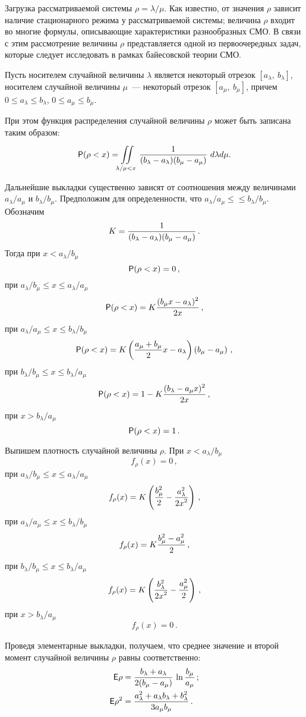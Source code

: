 \begin{multicols}{2}
Загрузка рассматриваемой системы $\rho=\lambda/\mu$. Как известно, от значения $\rho$ зависит наличие стационарного
режима у рассматриваемой системы; величина $\rho$ входит во многие формулы, опи\-сы\-ва\-ющие характеристики разнообразных
СМО. В связи с этим рассмотрение величины $\rho$ представляется одной из первоочередных задач, которые следует
исследовать в рамках байесовской теории СМО.

Пусть носителем случайной величины $\lambda$ является некоторый отрезок $[a_\lambda,\ b_\lambda]$, носителем случайной
величины $\mu$~--- некоторый отрезок $[a_\mu,\ b_\mu]$, причем $0\le a_\lambda\le b_\lambda$, $0\le a_\mu\le b_\mu$.

При этом функция распределения случайной величины $\rho$ может быть записана таким образом:
$$\p(\rho<x)=\int\!\!\!\!\!\!\il{\!\!\!\!\lambda/\mu<x}{}\fr{1}{(b_\lambda-a_\lambda)(b_\mu-a_\mu)}\
d\lambda d\mu.$$

Дальнейшие выкладки существенно зависят от соотношения между величинами $a_\lambda/a_\mu$ и $b_\lambda/b_\mu$.
Предположим для определенности, что $a_\lambda/a_\mu\le$\linebreak $\le  b_\lambda/b_\mu$. Обозначим
$$
K=\displaystyle\frac{\displaystyle 1\mathstrut}{\displaystyle (b_\lambda-a_\lambda)(b_\mu-a_\mu)\mathstrut}\,.
$$
Тогда при $x< a_\lambda/b_\mu$
$$
{\sf P}(\rho<x)=0\,,
$$
при $a_\lambda/b_\mu\le x\le a_\lambda/a_\mu$
$$
{\sf P}(\rho<x)=K\displaystyle\frac{\displaystyle (b_\mu x-a_\lambda)^2\mathstrut}{\displaystyle 2x\mathstrut}\,,
$$
при $a_\lambda/a_\mu\le x\le b_\lambda/b_\mu$
$$
{\sf P}(\rho<x)=K\left(\displaystyle\frac{\displaystyle a_\mu+b_\mu\mathstrut}{\displaystyle 2\mathstrut}x-a_\lambda\right)\left(b_\mu-a_\mu\right)\,,
$$
при $b_\lambda/b_\mu\le x\le b_\lambda/a_\mu$
$$
{\sf P}(\rho<x)=1-K\displaystyle\frac{\displaystyle (b_\lambda-a_\mu x)^2\mathstrut}{\displaystyle 2x\mathstrut}\,,
$$
при $x>b_\lambda/a_\mu$
$$
{\sf P}(\rho<x)=1\,.
$$

Выпишем плотность случайной величины $\rho$. При $x< a_\lambda/b_\mu$
$$
f_\rho(x)=0\,,
$$
при $a_\lambda/b_\mu\le x\le a_\lambda/a_\mu$
$$
f_\rho(x)=K\left(\displaystyle\frac{\displaystyle b_\mu^2\mathstrut}{\displaystyle 2\mathstrut}-\displaystyle\frac{\displaystyle a_\lambda^2\mathstrut}{\displaystyle 2x^2\mathstrut}\right)\,,
$$
при $a_\lambda/a_\mu\le x\le b_\lambda/b_\mu$
$$
f_\rho(x)=K\displaystyle\frac{\displaystyle b_\mu^2-a_\mu^2\mathstrut}{\displaystyle 2\mathstrut}\,,
$$
при $b_\lambda/b_\mu\le x\le b_\lambda/a_\mu$
$$
f_\rho(x)=K\left(\displaystyle\frac{\displaystyle b_\lambda^2\mathstrut}{\displaystyle 2x^2\mathstrut}-\displaystyle\frac{\displaystyle a_\mu^2\mathstrut}{\displaystyle 2\mathstrut}\right)\,,
$$
при $x>b_\lambda/a_\mu$
$$
f_\rho(x)=0\,.
$$

Проведя элементарные выкладки, получаем, что среднее значение и второй момент случайной величины $\rho$
равны соответственно:
\begin{align*}
{\sf E}\rho&=\displaystyle\frac{\displaystyle b_\lambda+a_\lambda\mathstrut}{\displaystyle 2(b_\mu-a_\mu)\mathstrut}\, \ln\displaystyle\frac{\displaystyle b_\mu\mathstrut}{\displaystyle a_\mu\mathstrut}\,;\\
{\sf E}\rho^2&=\displaystyle\frac{\displaystyle a_\lambda^2+a_\lambda b_\lambda+b_\lambda^2\mathstrut}{\displaystyle 3a_\mu b_\mu\mathstrut}\,.
\end{align*}


\end{multicols}
